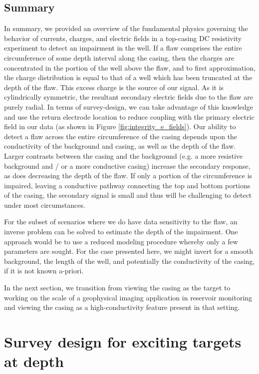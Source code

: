 

\subsection{Summary}
In summary, we provided an overview of the fundamental physics governing the behavior of currents, charges, and electric fields in a top-casing DC resistivity experiment to detect an impairment in the well. If a flaw comprises the entire circumference of some depth interval along the casing, then the charges are concentrated in the portion of the well above the flaw, and to first approximation, the charge distribution is equal to that of a well which has been truncated at the depth of the flaw. This excess charge is the source of our signal. As it is cylindrically symmetric, the resultant secondary electric fields due to the flaw are purely radial. In terms of survey-design, we can take advantage of this knowledge and use the return electrode location to reduce coupling with the primary electric field in our data (as shown in Figure \ref{fig:integrity_e_fields}). Our ability to detect a flaw across the entire circumference of the casing depends upon the conductivity of the background and casing, as well as the depth of the flaw. Larger contrasts between the casing and the background (e.g. a more resistive background and / or a more conductive casing) increase the secondary response, as does decreasing the depth of the flaw. If only a portion of the circumference is impaired, leaving a conductive pathway connecting the top and bottom portions of the casing, the secondary signal is small and thus will be challenging to detect under most circumstances.

For the subset of scenarios where we do have data sensitivity to the flaw, an inverse problem can be solved to  estimate the depth of the impairment. One approach would be to use a reduced modeling procedure whereby only a few parameters are sought. For the case presented here, we might invert for a smooth background, the length of the well, and potentially the conductivity of the casing, if it is not known a-priori.

In the next section, we transition from viewing the casing as the target to working on the scale of a geophysical imaging application in reservoir monitoring and viewing the casing as a high-conductivity feature present in that setting.

\section{Survey design for exciting targets at depth}
\label{sec:survey_design}

